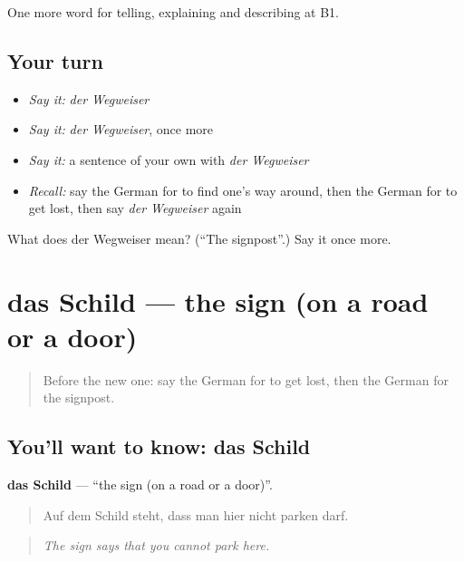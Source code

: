 \begin{grammarlens}[title={What you've built}]
One more word for telling, explaining and describing at B1.
\end{grammarlens}

\subsection*{Your turn}
\begin{itemize}
\raggedright
  \item \emph{Say it:} \emph{der Wegweiser}
  \item \emph{Say it:} \emph{der Wegweiser}, once more
  \item \emph{Say it:} a sentence of your own with \emph{der Wegweiser}
  \item \emph{Recall:} say the German for to find one's way around, then the German for to get lost, then say \emph{der Wegweiser} again
\end{itemize}

\begin{tcolorbox}[breakable,colback=teal!4,colframe=teal!35!black,title={Before you move on}]
What does der Wegweiser mean? (\textquotedblleft{}The signpost\textquotedblright{}.) Say it once more.
\end{tcolorbox}
\section[das Schild]{das Schild — the sign (on a road or a door)}

\label{lesson:GE-C434-schild}



\begin{quote}
Before the new one: say the German for to get lost, then the German for the signpost.
\end{quote}

\subsection*{You'll want to know: das Schild}
\textbf{das Schild} — \textquotedblleft{}the sign (on a road or a door)\textquotedblright{}.

\begin{quote}
Auf dem Schild steht, dass man hier nicht parken darf.
\end{quote}

\begin{quote}
\emph{The sign says that you cannot park here.}
\end{quote}

